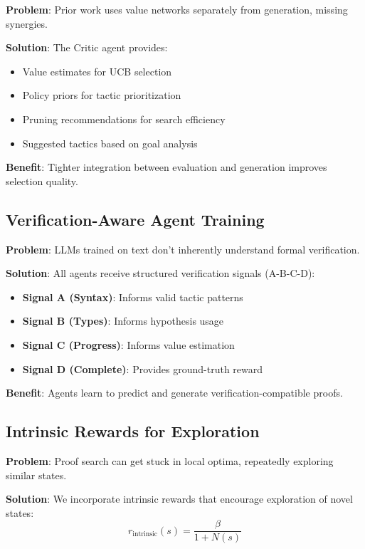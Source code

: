 \documentclass[11pt]{article}
\begin{document}
\textbf{Problem}: Prior work uses value networks separately from generation, missing synergies.

\textbf{Solution}: The Critic agent provides:
\begin{itemize}
    \item Value estimates for UCB selection
    \item Policy priors for tactic prioritization
    \item Pruning recommendations for search efficiency
    \item Suggested tactics based on goal analysis
\end{itemize}

\textbf{Benefit}: Tighter integration between evaluation and generation improves selection quality.

\subsection{Verification-Aware Agent Training}

\textbf{Problem}: LLMs trained on text don't inherently understand formal verification.

\textbf{Solution}: All agents receive structured verification signals (A-B-C-D):
\begin{itemize}
    \item \textbf{Signal A (Syntax)}: Informs valid tactic patterns
    \item \textbf{Signal B (Types)}: Informs hypothesis usage
    \item \textbf{Signal C (Progress)}: Informs value estimation
    \item \textbf{Signal D (Complete)}: Provides ground-truth reward
\end{itemize}

\textbf{Benefit}: Agents learn to predict and generate verification-compatible proofs.

\subsection{Intrinsic Rewards for Exploration}

\textbf{Problem}: Proof search can get stuck in local optima, repeatedly exploring similar states.

\textbf{Solution}: We incorporate intrinsic rewards that encourage exploration of novel states:
\begin{equation}
    r_{\text{intrinsic}}(s) = \frac{\beta}{1 + N(s)}
\end{equation}
\end{document}
